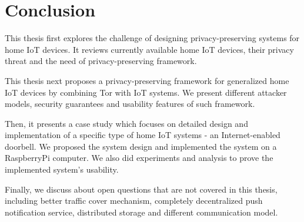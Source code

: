 \chapter{Conclusion}
This thesis first explores the challenge of designing privacy-preserving systems for home IoT devices. It reviews currently available home IoT devices, their privacy threat and the need of privacy-preserving framework.

This thesis next proposes a privacy-preserving framework for generalized home IoT devices by combining Tor with IoT systems. We present different attacker models, security guarantees and usability features of such framework.

Then, it presents a case study which focuses on detailed design and implementation of a specific type of home IoT systems - an Internet-enabled doorbell. We proposed the system design and implemented the system on a RaspberryPi computer. We also did experiments and analysis to prove the implemented system's usability.

Finally, we discuss about open questions that are not covered in this thesis, including better traffic cover mechanism, completely decentralized push notification service, distributed storage and different communication model.